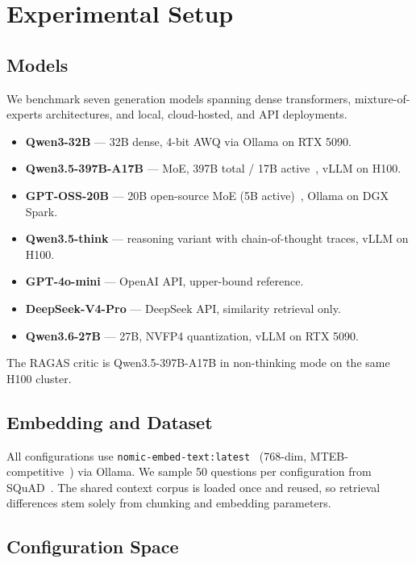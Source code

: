 \section{Experimental Setup}
\label{sec:setup}

\subsection{Models}

We benchmark seven generation models spanning dense transformers, mixture-of-experts architectures, and local, cloud-hosted, and API deployments.

\begin{itemize}
  \item \textbf{Qwen3-32B} --- 32B dense, 4-bit AWQ via Ollama on RTX 5090.
  \item \textbf{Qwen3.5-397B-A17B} --- MoE, 397B total / 17B active~\cite{qwen2025qwen3}, vLLM on H100.
  \item \textbf{GPT-OSS-20B} --- 20B open-source MoE (5B active)~\cite{gptoss2024}, Ollama on DGX Spark.
  \item \textbf{Qwen3.5-think} --- reasoning variant with chain-of-thought traces, vLLM on H100.
  \item \textbf{GPT-4o-mini} --- OpenAI API, upper-bound reference.
  \item \textbf{DeepSeek-V4-Pro} --- DeepSeek API, similarity retrieval only.
  \item \textbf{Qwen3.6-27B} --- 27B, NVFP4 quantization, vLLM on RTX 5090.
\end{itemize}

The RAGAS critic is Qwen3.5-397B-A17B in non-thinking mode on the same H100 cluster.

\subsection{Embedding and Dataset}

All configurations use \texttt{nomic-embed-text:latest}~\cite{nomic2024nomic} (768-dim, MTEB-competitive~\cite{muennighoff2022mteb}) via Ollama. We sample 50 questions per configuration from SQuAD~\cite{rajpurkar2016squad}. The shared context corpus is loaded once and reused, so retrieval differences stem solely from chunking and embedding parameters.

\subsection{Configuration Space}

